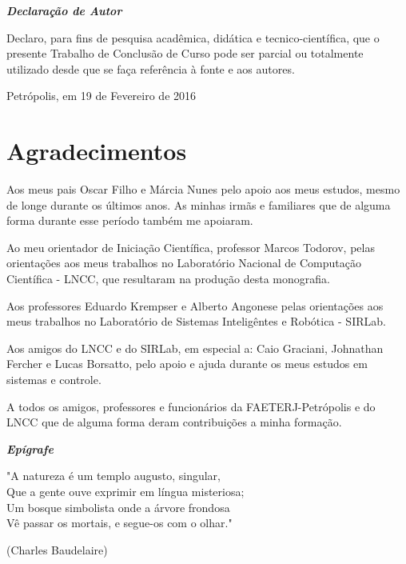 \documentclass[brazil,ruledheader]{abntifes}
\newcommand{\AUTOR}{Oscar Neiva Eulálio Neto}
\newcommand{\DATA}{19 de Fevereiro de 2016}
\begin{document}
\vfill 
\null
\begin{center}
{\Huge {\bfseries\itshape Declaração de Autor}}\\[3cm]
\begin{espacoduplo}
Declaro, para fins de pesquisa acadêmica, didática e tecnico-científica, que o presente Trabalho de Conclusão
de Curso pode ser parcial ou totalmente utilizado desde que se faça referência à fonte e aos autores.
\end{espacoduplo}
\setlength{\ABNTsignthickness}{0.4pt}
\assinatura{\AUTOR}
Petrópolis, em \DATA
\end{center}


\chapter*{Agradecimentos}
Aos meus pais Oscar Filho e Márcia Nunes pelo apoio aos meus estudos, mesmo de longe durante os últimos anos. As minhas irmãs e familiares que de alguma forma durante esse período também me apoiaram.

Ao meu orientador de Iniciação Científica, professor Marcos Todorov, pelas orientações aos meus trabalhos no Laboratório Nacional de Computação Científica - LNCC, que resultaram na produção desta monografia.

Aos professores Eduardo Krempser e Alberto Angonese pelas orientações aos meus trabalhos no Laboratório de Sistemas Inteligêntes e Robótica - SIRLab.

Aos amigos do LNCC e do SIRLab, em especial a: Caio Graciani, Johnathan Fercher e Lucas Borsatto, pelo apoio e ajuda durante os meus estudos em sistemas e controle.

A todos os amigos, professores e funcionários da FAETERJ-Petrópolis e do LNCC que de alguma forma deram contribuições a minha formação. 
\vfill 
\null

\vspace{10cm}
\begin{center}
{\Huge {\bfseries\itshape Epígrafe}}\\[3cm]
\vspace{10cm}
\end{center}



\epigraph{"A natureza é um templo augusto, singular,\\ 
		Que a gente ouve exprimir em língua misteriosa;\\
		Um bosque simbolista onde a árvore frondosa\\
		Vê passar os mortais, e segue-os com o olhar."}{(Charles Baudelaire)}
\end{document}
